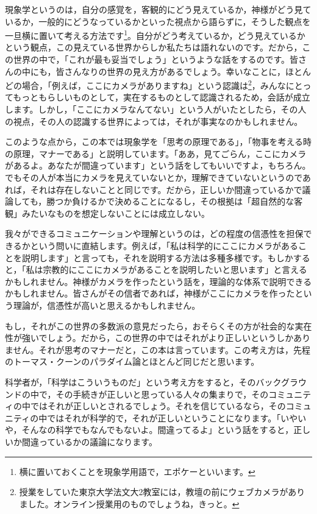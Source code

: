 \documentclass{ltjsbook}
\begin{document}
現象学というのは，自分の感覚を，客観的にどう見えているか，神様がどう見ているか，一般的にどうなっているかといった視点から語らずに，そうした観点を一旦横に置いて考える方法です\footnote{横に置いておくことを現象学用語で，エポケーといいます。}。自分がどう考えているか，どう見えているかという観点，この見えている世界からしか私たちは語れないのです。だから，この世界の中で，「これが最も妥当でしょう」というような話をするのです。皆さんの中にも，皆さんなりの世界の見え方があるでしょう。幸いなことに，ほとんどの場合，「例えば，ここにカメラがありますね」という認識は\footnote{授業をしていた東京大学法文大2教室には，教壇の前にウェブカメラがありました。オンライン授業用のものでしょうね，きっと。}，みんなにとってもっともらしいものとして，実在するものとして認識されるため，会話が成立します。しかし，「ここにカメラなんてない」という人がいたとしたら，その人の視点，その人の認識する世界によっては，それが事実なのかもしれません。

このような点から，この本では現象学を「思考の原理である」，「物事を考える時の原理，マナーである」と説明しています。「ああ，見てごらん，ここにカメラがあるよ。あなたが間違っています」という話をしてもいいですよ，もちろん。でもその人が本当にカメラを見えていないとか，理解できていないというのであれば，それは存在しないことと同じです。だから，正しいか間違っているかで議論しても，勝つか負けるかで決めることになるし，その根拠は「超自然的な客観」みたいなものを想定しないことには成立しない。

我々ができるコミュニケーションや理解というのは，どの程度の信憑性を担保できるかという問いに直結します。例えば，「私は科学的にここにカメラがあることを説明します」と言っても，それを説明する方法は多種多様です。もしかすると，「私は宗教的にここにカメラがあることを説明したいと思います」と言えるかもしれません。神様がカメラを作ったという話を，理論的な体系で説明できるかもしれません。皆さんがその信者であれば，神様がここにカメラを作ったという理論が，信憑性が高いと思えるかもしれません。

もし，それがこの世界の多数派の意見だったら，おそらくその方が社会的な実在性が強いでしょう。だから，この世界の中ではそれがより正しいというしかありません。それが思考のマナーだと，この本は言っています。この考え方は，先程のトーマス・クーンのパラダイム論とほとんど同じだと思います。

科学者が，「科学はこういうものだ」という考え方をすると，そのバックグラウンドの中で，その手続きが正しいと思っている人々の集まりで，そのコミュニティの中ではそれが正しいとされるでしょう。それを信じているなら，そのコミュニティの中ではそれが科学的で，それが正しいということになります。「いやいや，そんなの科学でもなんでもないよ。間違ってるよ」という話をすると，正しいか間違っているかの議論になります。
\end{document}

